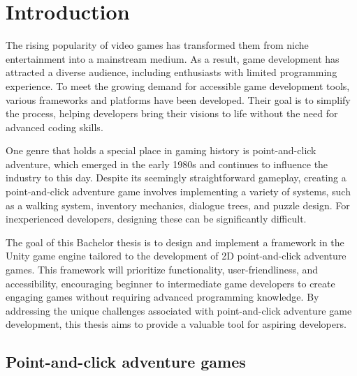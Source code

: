 \chapter{Introduction}
The rising popularity of video games has transformed them from niche entertainment into a mainstream medium. As a result, game development has attracted a diverse audience, including enthusiasts with limited programming experience. To meet the growing demand for accessible game development tools, various frameworks and platforms have been developed. Their goal is to simplify the process, helping developers bring their visions to life without the need for advanced coding skills.

One genre that holds a special place in gaming history is point-and-click adventure, which emerged in the early 1980s and continues to influence the industry to this day. Despite its seemingly straightforward gameplay, creating a point-and-click adventure game involves implementing a variety of systems, such as a walking system, inventory mechanics, dialogue trees, and puzzle design. For inexperienced developers, designing these can be significantly difficult.

The goal of this Bachelor thesis is to design and implement a framework in the Unity game engine tailored to the development of 2D point-and-click adventure games. This framework will prioritize functionality, user-friendliness, and accessibility, encouraging beginner to intermediate game developers to create engaging games without requiring advanced programming knowledge. By addressing the unique challenges associated with point-and-click adventure game development, this thesis aims to provide a valuable tool for aspiring developers.

\section{Point-and-click adventure games}

